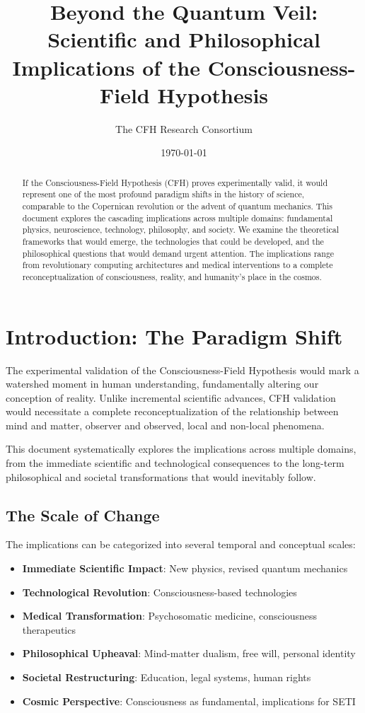 \documentclass[12pt,article]{memoir}
\title{\textbf{Beyond the Quantum Veil: Scientific and Philosophical Implications of the Consciousness-Field Hypothesis}}
\author[1]{The CFH Research Consortium}
\affil[1]{Nexus Institute for Consciousness-Quantum Studies}
\date{\today}
\begin{document}
\maketitle

\begin{abstract}
If the Consciousness-Field Hypothesis (CFH) proves experimentally valid, it would represent one of the most profound paradigm shifts in the history of science, comparable to the Copernican revolution or the advent of quantum mechanics. This document explores the cascading implications across multiple domains: fundamental physics, neuroscience, technology, philosophy, and society. We examine the theoretical frameworks that would emerge, the technologies that could be developed, and the philosophical questions that would demand urgent attention. The implications range from revolutionary computing architectures and medical interventions to a complete reconceptualization of consciousness, reality, and humanity's place in the cosmos.
\end{abstract}

\tableofcontents
\newpage

\chapter{Introduction: The Paradigm Shift}

The experimental validation of the Consciousness-Field Hypothesis would mark a watershed moment in human understanding, fundamentally altering our conception of reality. Unlike incremental scientific advances, CFH validation would necessitate a complete reconceptualization of the relationship between mind and matter, observer and observed, local and non-local phenomena.

This document systematically explores the implications across multiple domains, from the immediate scientific and technological consequences to the long-term philosophical and societal transformations that would inevitably follow.

\section{The Scale of Change}

The implications can be categorized into several temporal and conceptual scales:

\begin{itemize}
    \item \textbf{Immediate Scientific Impact}: New physics, revised quantum mechanics
    \item \textbf{Technological Revolution}: Consciousness-based technologies
    \item \textbf{Medical Transformation}: Psychosomatic medicine, consciousness therapeutics
    \item \textbf{Philosophical Upheaval}: Mind-matter dualism, free will, personal identity
    \item \textbf{Societal Restructuring}: Education, legal systems, human rights
    \item \textbf{Cosmic Perspective}: Consciousness as fundamental, implications for SETI
\end{itemize}
\end{document}
